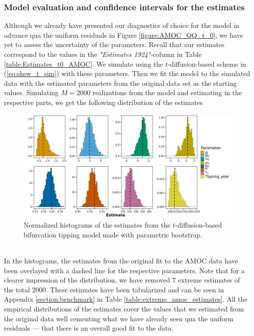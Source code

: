 \subsubsection{Model evaluation and confidence intervals for the estimates}
Although we already have presented our diagnostics of choice for the model in advance qua the uniform residuals in Figure \ref{figure:AMOC_QQ_t_0}, we have yet to assess the uncertainty of the parameters. Recall that our estimates correspond to the values in the \textit{"Estimates 1924"}-column in Table \ref{table:Estimates_t0_AMOC}. We simulate using the $t$-diffusion-based scheme in (\ref{eq:skew_t_sim}) with these parameters. Then we fit the model to the simulated data with the estimated parameters from the original data set as the starting values. Simulating $M = 2000$ realizations from the model and estimating in the respective parts, we get the following distribution of the estimates
\begin{figure}[h!]
    \begin{center}
    \includegraphics[scale = .095]{figures/estim_tibble_plot.jpeg}
    \caption{Normalized histograms of the estimates from the $t$-diffusion-based bifurcation tipping model made with parametric bootstrap.}
    \label{figure:AMOC_parametric_bootstrap}
    \end{center}
\end{figure}\\
In the histograms, the estimates from the original fit to the AMOC data have been overlayed with a dashed line for the respective parameters. Note that for a clearer impression of the distribution, we have removed $7$ extreme estimates of the total $2000$. These estimates have been tabularized and can be seen in Appendix \ref{section:benchmark} in Table \ref{table:extreme_amoc_estimates}. All the empirical distributions of the estimates cover the values that we estimated from the original data well cementing what we have already seen qua the uniform residuals — that there is an overall good fit to the data.

